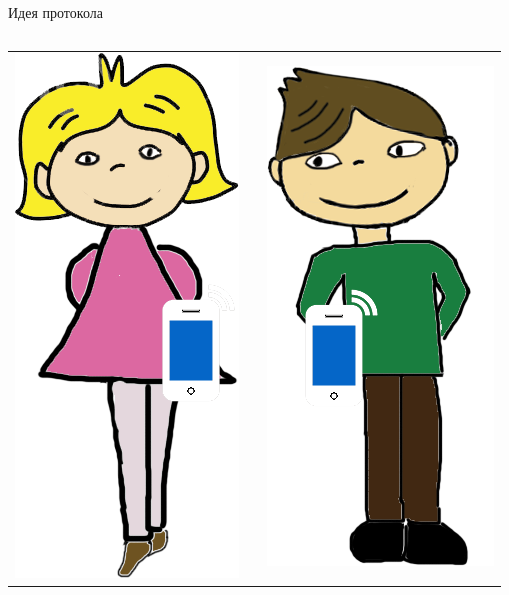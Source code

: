 \documentclass[usenames,dvipsnames,8pt,aspectratio=169]{beamer}
\begin{document}
\begin{frame}{Идея протокола}
\begin{columns}[T]
\begin{column}{0.5\textwidth}
\begin{tabular}{c c c}
			\includegraphics[scale=0.2]{Alice_phone} & &\includegraphics[scale=0.2]{Bob_phone} \\
		\end{tabular}
	\end{column}
	\end{columns}
	
\end{frame}
\end{document}
